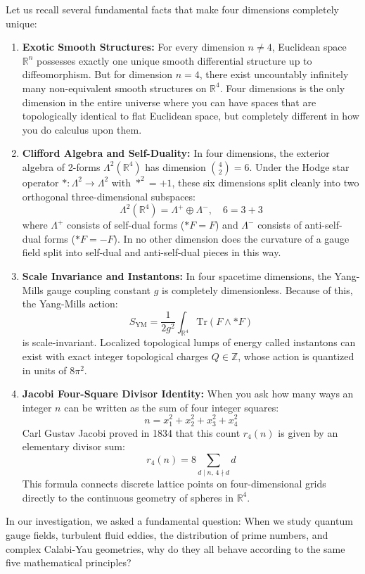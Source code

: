 \documentclass[11pt,a4paper]{article}
\begin{document}
Let us recall several fundamental facts that make four dimensions completely unique:
\begin{enumerate}
    \item \textbf{Exotic Smooth Structures:} For every dimension $n \neq 4$, Euclidean space $\mathbb{R}^n$ possesses exactly one unique smooth differential structure up to diffeomorphism. But for dimension $n = 4$, there exist uncountably infinitely many non-equivalent smooth structures on $\mathbb{R}^4$. Four dimensions is the only dimension in the entire universe where you can have spaces that are topologically identical to flat Euclidean space, but completely different in how you do calculus upon them.
    \item \textbf{Clifford Algebra and Self-Duality:} In four dimensions, the exterior algebra of 2-forms $\Lambda^2(\mathbb{R}^4)$ has dimension $\binom{4}{2} = 6$. Under the Hodge star operator $*: \Lambda^2 \to \Lambda^2$ with $*^2 = +1$, these six dimensions split cleanly into two orthogonal three-dimensional subspaces:
    $$\Lambda^2(\mathbb{R}^4) = \Lambda^+ \oplus \Lambda^-, \quad 6 = 3 + 3$$
    where $\Lambda^+$ consists of self-dual forms ($*F = F$) and $\Lambda^-$ consists of anti-self-dual forms ($*F = -F$). In no other dimension does the curvature of a gauge field split into self-dual and anti-self-dual pieces in this way.
    \item \textbf{Scale Invariance and Instantons:} In four spacetime dimensions, the Yang-Mills gauge coupling constant $g$ is completely dimensionless. Because of this, the Yang-Mills action:
    $$S_{\mathrm{YM}} = \frac{1}{2 g^2} \int_{\mathbb{R}^4} \mathrm{Tr}(F \wedge *F)$$
    is scale-invariant. Localized topological lumps of energy called instantons can exist with exact integer topological charges $Q \in \mathbb{Z}$, whose action is quantized in units of $8\pi^2$.
    \item \textbf{Jacobi Four-Square Divisor Identity:} When you ask how many ways an integer $n$ can be written as the sum of four integer squares:
    $$n = x_1^2 + x_2^2 + x_3^2 + x_4^2$$
    Carl Gustav Jacobi proved in 1834 that this count $r_4(n)$ is given by an elementary divisor sum:
    $$r_4(n) = 8 \sum_{d \mid n, \, 4 \nmid d} d$$
    This formula connects discrete lattice points on four-dimensional grids directly to the continuous geometry of spheres in $\mathbb{R}^4$.
\end{enumerate}

In our investigation, we asked a fundamental question: When we study quantum gauge fields, turbulent fluid eddies, the distribution of prime numbers, and complex Calabi-Yau geometries, why do they all behave according to the same five mathematical principles? 
\end{document}
